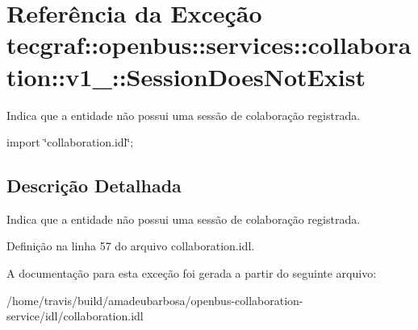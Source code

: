 \hypertarget{exceptiontecgraf_1_1openbus_1_1services_1_1collaboration_1_1v1__0_1_1SessionDoesNotExist}{\section{\-Referência da \-Exceção tecgraf\-:\-:openbus\-:\-:services\-:\-:collaboration\-:\-:v1\-\_\-:\-:\-Session\-Does\-Not\-Exist}
\label{exceptiontecgraf_1_1openbus_1_1services_1_1collaboration_1_1v1__0_1_1SessionDoesNotExist}
}


\-Indica que a entidade não possui uma sessão de colaboração registrada.  




{\ttfamily import \char`\"{}collaboration.\-idl\char`\"{};}



\subsection{\-Descrição \-Detalhada}
\-Indica que a entidade não possui uma sessão de colaboração registrada. 

\-Definição na linha 57 do arquivo collaboration.\-idl.



\-A documentação para esta exceção foi gerada a partir do seguinte arquivo\-:\begin{DoxyCompactItemize}
\item 
/home/travis/build/amadeubarbosa/openbus-\/collaboration-\/service/idl/collaboration.\-idl\end{DoxyCompactItemize}
